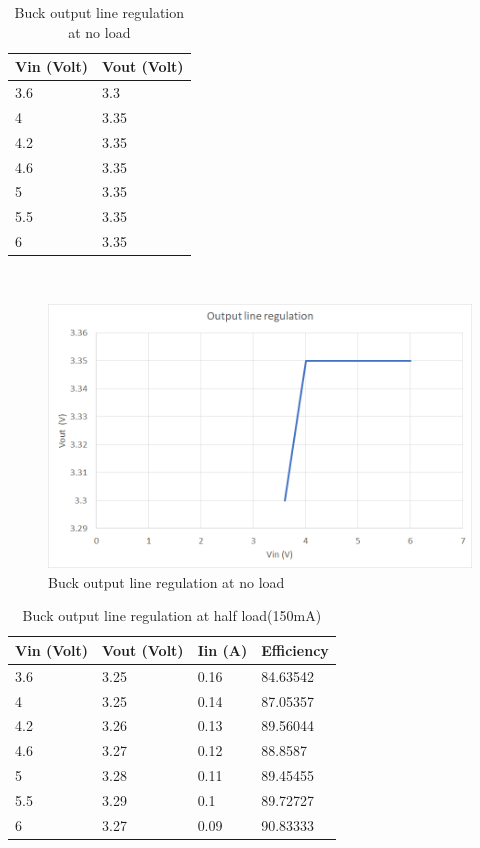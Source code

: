 \begin{table}[H]
\centering
\begin{tabular}{|l|l|}
\hline
Vin (Volt) & Vout (Volt) \\ \hline
3.6        & 3.3         \\ \hline
4          & 3.35        \\ \hline
4.2        & 3.35        \\ \hline
4.6        & 3.35        \\ \hline
5          & 3.35        \\ \hline
5.5        & 3.35        \\ \hline
6          & 3.35        \\ \hline
\end{tabular}
\caption{Buck output line regulation at no load}
\label{table:4}
\end{table}
\\
\begin{figure}[H]
	\centering
	\includegraphics[width=\columnwidth]{IMGS/Buck line regulation at no load.png}
	\caption{Buck output line regulation at no load}
	\label{fig:arch}
\end{figure}
\begin{table}[H]
\centering
\begin{tabular}{|l|l|l|l|}
\hline
Vin (Volt) & Vout (Volt) & Iin (A) & Efficiency \\ \hline
3.6        & 3.25        & 0.16    & 84.63542   \\ \hline
4          & 3.25        & 0.14    & 87.05357   \\ \hline
4.2        & 3.26        & 0.13    & 89.56044   \\ \hline
4.6        & 3.27        & 0.12    & 88.8587    \\ \hline
5          & 3.28        & 0.11    & 89.45455   \\ \hline
5.5        & 3.29        & 0.1     & 89.72727   \\ \hline
6          & 3.27        & 0.09    & 90.83333   \\ \hline
\end{tabular}
\caption{Buck output line regulation at half load(150mA)}
\label{table:4}
\end{table}
